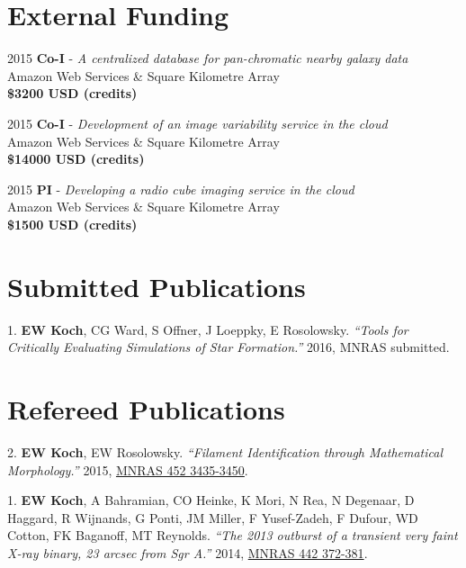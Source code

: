 \documentclass[letterpaper,11pt]{article}
\newlength{\mainindent} \setlength{\mainindent}{12pt}
\newlength{\contentindent} \setlength{\contentindent}{19ex}
\newenvironment{datelist}{
  \begingroup
  \raggedright
  \begin{description}[labelindent=\mainindent,leftmargin=\contentindent,
      style=sameline,font=\normalfont,topsep=0pt,partopsep=0pt,parsep=0pt,
      itemsep=4pt]
}{
  \end{description}
  \endgroup
}
\newenvironment{publist}{
  \begingroup
  \raggedright
  \begin{description}[leftmargin=4ex,style=sameline]
}{
  \end{description}
  \endgroup
}
\begin{document}
\section*{External Funding}
\begin{datelist}
\item[2015] \textbf{Co-I} - \emph{A centralized database for pan-chromatic nearby galaxy data} \\ Amazon Web Services \& Square Kilometre Array \\ \textbf{\$3200 USD (credits)}
\item[2015] \textbf{Co-I} - \emph{Development of an image variability service in the cloud} \\ Amazon Web Services \& Square Kilometre Array \\ \textbf{\$14000 USD (credits)}
\item[2015] \textbf{PI} - \emph{Developing a radio cube imaging service in the cloud} \\ Amazon Web Services \& Square Kilometre Array \\ \textbf{\$1500 USD (credits)}
\end{datelist}



\section*{Submitted Publications}

\begin{publist}
\item[1.] \textbf{EW Koch}, CG Ward, S Offner, J Loeppky, E Rosolowsky. \textit{``Tools for Critically Evaluating Simulations of Star Formation.''} 2016, MNRAS submitted.
\end{publist}

\section*{Refereed Publications}

\begin{publist}
\item[2.] \textbf{EW Koch}, EW Rosolowsky. \textit{``Filament Identification through Mathematical Morphology.''} 2015, \href{http://adsabs.harvard.edu/abs/2015MNRAS.452.3435K}{MNRAS 452 3435-3450}.
\item[1.] \textbf{EW Koch}, A Bahramian, CO Heinke, K Mori, N Rea, N Degenaar, D Haggard, R Wijnands, G Ponti, JM Miller, F Yusef-Zadeh, F Dufour, WD Cotton, FK Baganoff, MT Reynolds. \textit{``The 2013 outburst of a transient very faint X-ray binary, 23 arcsec from Sgr A\textasteriskcentered.''} 2014, \href{http://adsabs.harvard.edu/abs/2014MNRAS.442..372K}{MNRAS 442 372-381}.
\end{publist}
\end{document}
